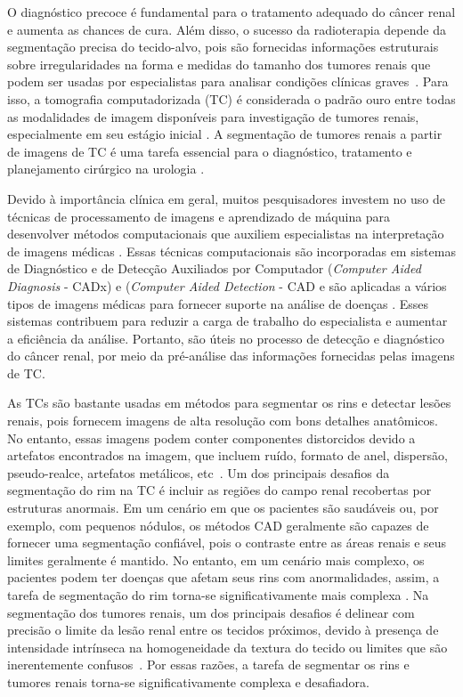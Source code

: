 O diagnóstico precoce é fundamental para o tratamento adequado do câncer renal e aumenta as chances de cura. Além disso, o sucesso da radioterapia depende da segmentação precisa do tecido-alvo, pois são fornecidas informações estruturais sobre irregularidades na forma e medidas do tamanho dos tumores renais que podem ser usadas por especialistas para analisar condições clínicas graves~\cite{dallal2017automatic}. Para isso, a tomografia computadorizada (TC) é considerada o padrão ouro entre todas as modalidades de imagem disponíveis para investigação de tumores renais, especialmente em seu estágio inicial \cite{kaur2016survey}. A segmentação de tumores renais a partir de imagens de TC é uma tarefa essencial para o diagnóstico, tratamento e planejamento cirúrgico na urologia \cite{yang2014automatic}. 

Devido à importância clínica em geral, muitos pesquisadores investem no uso de técnicas de processamento de imagens e aprendizado de máquina para desenvolver métodos computacionais que auxiliem especialistas na interpretação de imagens médicas \cite{GWYNNE2012250,diniz2019spinal,da2020kidney}. Essas técnicas computacionais são incorporadas em sistemas de Diagnóstico e de Detecção Auxiliados por Computador (\textit{Computer Aided Diagnosis} - CADx) e (\textit{Computer Aided Detection} - CAD e são aplicadas a vários tipos de imagens médicas para fornecer suporte na análise de doenças \cite{selvanayaki2010cad, padilla2011nmf, eldahshan20145526, ghafoorian20166246}. Esses sistemas contribuem para reduzir a carga de trabalho do especialista e aumentar a  eficiência da análise. Portanto, são úteis no processo de detecção e diagnóstico do câncer renal, por meio da pré-análise das informações fornecidas pelas imagens de TC.

As TCs são bastante usadas em métodos para segmentar os rins e detectar lesões renais, pois fornecem imagens de alta resolução com bons detalhes anatômicos. No entanto, essas imagens podem conter componentes distorcidos devido a artefatos encontrados na imagem, que incluem ruído, formato de anel, dispersão, pseudo-realce, artefatos metálicos, etc~\cite{boas2012ct}. Um dos principais desafios da segmentação do rim na TC é incluir as regiões do campo renal recobertas por estruturas anormais. Em um cenário em que os pacientes são saudáveis ou, por exemplo, com pequenos nódulos, os métodos CAD geralmente são capazes de fornecer uma segmentação confiável, pois o contraste entre as áreas renais e seus limites geralmente é mantido. No entanto, em um cenário mais complexo, os pacientes podem ter doenças que afetam seus rins com anormalidades, assim, a tarefa de segmentação do rim torna-se significativamente mais complexa \cite{BERGERON2013216, candemir2017}. Na segmentação dos tumores renais, um dos principais desafios é delinear com precisão o limite da lesão renal entre os tecidos próximos, devido à presença de intensidade intrínseca na homogeneidade da textura do tecido ou limites que são inerentemente confusos~\cite{agnello2020ct}. Por essas razões, a tarefa de segmentar os rins e tumores renais torna-se significativamente complexa e desafiadora. 

